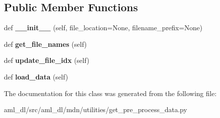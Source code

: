 \subsection*{Public Member Functions}
\begin{DoxyCompactItemize}
\item 
\hypertarget{classsrc_1_1aml__dl_1_1mdn_1_1utilities_1_1get__pre__process__data_1_1_load_preprocess_data_afb9ae90449429825537d05dc7d24f53e}{}\label{classsrc_1_1aml__dl_1_1mdn_1_1utilities_1_1get__pre__process__data_1_1_load_preprocess_data_afb9ae90449429825537d05dc7d24f53e} 
def {\bfseries \+\_\+\+\_\+init\+\_\+\+\_\+} (self, file\+\_\+location=None, filename\+\_\+prefix=None)
\item 
\hypertarget{classsrc_1_1aml__dl_1_1mdn_1_1utilities_1_1get__pre__process__data_1_1_load_preprocess_data_af4476bd8bafdfb62b4807499b15c7679}{}\label{classsrc_1_1aml__dl_1_1mdn_1_1utilities_1_1get__pre__process__data_1_1_load_preprocess_data_af4476bd8bafdfb62b4807499b15c7679} 
def {\bfseries get\+\_\+file\+\_\+names} (self)
\item 
\hypertarget{classsrc_1_1aml__dl_1_1mdn_1_1utilities_1_1get__pre__process__data_1_1_load_preprocess_data_a06536d454670a94bf611530fdf5b3595}{}\label{classsrc_1_1aml__dl_1_1mdn_1_1utilities_1_1get__pre__process__data_1_1_load_preprocess_data_a06536d454670a94bf611530fdf5b3595} 
def {\bfseries update\+\_\+file\+\_\+idx} (self)
\item 
\hypertarget{classsrc_1_1aml__dl_1_1mdn_1_1utilities_1_1get__pre__process__data_1_1_load_preprocess_data_ad5a7446535b93e73bb6875255dbaf91f}{}\label{classsrc_1_1aml__dl_1_1mdn_1_1utilities_1_1get__pre__process__data_1_1_load_preprocess_data_ad5a7446535b93e73bb6875255dbaf91f} 
def {\bfseries load\+\_\+data} (self)
\end{DoxyCompactItemize}


The documentation for this class was generated from the following file\+:\begin{DoxyCompactItemize}
\item 
aml\+\_\+dl/src/aml\+\_\+dl/mdn/utilities/get\+\_\+pre\+\_\+process\+\_\+data.\+py\end{DoxyCompactItemize}
